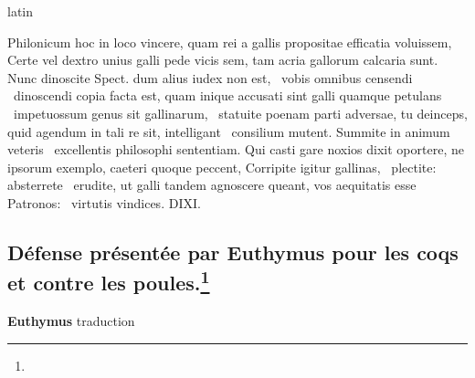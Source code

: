 \documentclass[12pt]{book}
\renewenvironment{latin}
    	{\begin{hyphenrules}{latin}}
    	{\end{hyphenrules}}
\begin{document}
\begin{pages}
\begin{latin}
\begin{Leftside}
Philonicum hoc in loco vincere, quam rei a gallis propositae efficatia voluissem, Certe vel dextro unius galli pede vicis sem, tam acria gallorum calcaria sunt. Nunc dinoscite Spect. dum alius iudex non est, ﻿\ampersand\ vobis omnibus censendi ﻿\ampersand\ dinoscendi copia facta est, quam inique accusati sint galli quamque petulans ﻿\ampersand\ impetuossum genus sit gallinarum, ﻿\ampersand\ statuite poenam parti adversae, tu deinceps, quid agendum in tali re sit, intelligant ﻿\ampersand\ consilium mutent. Summite in animum veteris ﻿\ampersand\ excellentis philosophi sententiam. Qui casti gare noxios dixit oportere, ne ipsorum exemplo, caeteri quoque peccent, Corripite igitur gallinas, ﻿\ampersand\ plectite: absterrete ﻿\ampersand\ erudite, ut galli tandem agnoscere queant, vos aequitatis esse Patronos: ﻿\ampersand\ virtutis vindices. DIXI.
                \pend 
        \endnumbering
        \end{Leftside}
        \end{latin}

        \begin{Rightside}
        \beginnumbering
            \pstart\section*{Défense présentée par Euthymus pour les coqs et contre les poules.\footnote{}}\pend\pstart\textbf{Euthymus}\hspace{1cm} 
                        traduction
                    \pend
        \endnumbering
        \end{Rightside}
        \end{pages}
        \Pages
        
\end{document}
